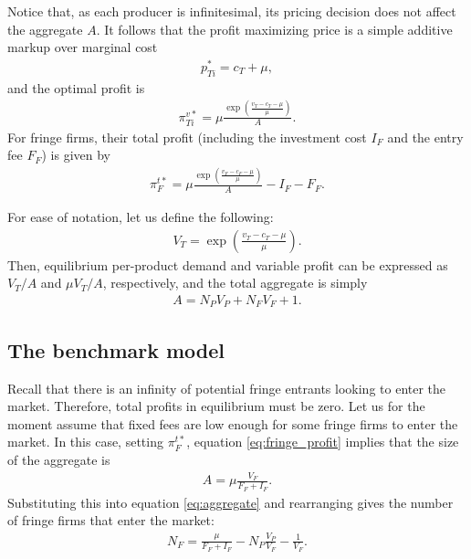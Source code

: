 \documentclass[a4paper]{article}
\begin{document}
Notice that, as each producer is infinitesimal, its pricing decision does not affect the aggregate $A$.
It follows that the profit maximizing price is a simple additive markup over marginal cost
\begin{align*}
    p^*_{Ti} = c_T + \mu,
\end{align*}
and the optimal profit is
\begin{align}
    \pi^{v*}_{Ti} = \mu \frac{\exp \left( \frac{v_T - c_T - \mu}{\mu} \right)}{A}.
    \label{eq:optimal_profit}
\end{align}
For fringe firms, their total profit (including the investment cost $I_F$ and the entry fee $F_F$) is given by
\begin{align}
    \pi^{t*}_F = \mu \frac{\exp \left( \frac{v_F - c_F - \mu}{\mu} \right)}{A} - I_F - F_F.
    \label{eq:fringe_profit}
\end{align}

For ease of notation, let us define the following:
\begin{align*}
    V_T = \exp \left( \frac{v_T - c_T - \mu}{\mu} \right).
\end{align*}
Then, equilibrium per-product demand and variable profit can be expressed as $V_T/ A$ and $\mu V_T/ A$, respectively, and the total aggregate is simply
\begin{align*}
    A = N_P V_P + N_F V_F + 1.
\end{align*}

\subsection{The benchmark model}

Recall that there is an infinity of potential fringe entrants looking to enter the market.
Therefore, total profits in equilibrium must be zero.
Let us for the moment assume that fixed fees are low enough for some fringe firms to enter the market.
In this case, setting $\pi^{t*}_F$, equation \eqref{eq:fringe_profit} implies that the size of the aggregate is
\begin{align}
    A = \mu \frac{V_F}{F_F + I_F}.
    \label{eq:aggregate_eq}
\end{align}
Substituting this into equation \eqref{eq:aggregate} and rearranging gives the number of fringe firms that enter the market:
\begin{align*}
    N_F = \frac{\mu}{F_F + I_F} - N_P \frac{V_P}{V_F} - \frac{1}{V_F}.
\end{align*}
\end{document}
